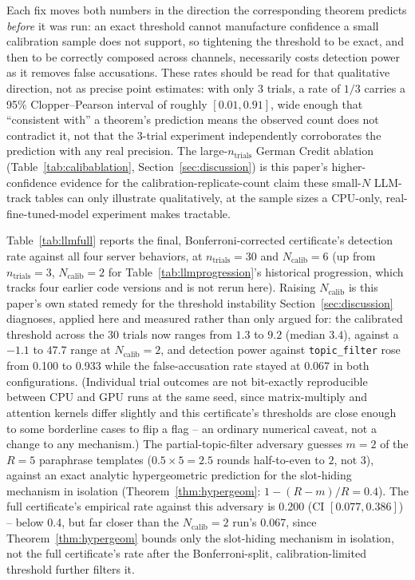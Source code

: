 \documentclass[10pt,journal,compsoc]{IEEEtran}
\begin{document}
Each fix moves both numbers in the direction the corresponding theorem predicts \emph{before} it was run: an exact threshold cannot manufacture confidence a small calibration sample does not support, so tightening the threshold to be exact, and then to be correctly composed across channels, necessarily costs detection power as it removes false accusations. These rates should be read for that qualitative direction, not as precise point estimates: with only 3 trials, a rate of $1/3$ carries a 95\% Clopper--Pearson interval of roughly $[0.01, 0.91]$, wide enough that ``consistent with'' a theorem's prediction means the observed count does not contradict it, not that the 3-trial experiment independently corroborates the prediction with any real precision. The large-$n_{\text{trials}}$ German Credit ablation (Table~\ref{tab:calibablation}, Section~\ref{sec:discussion}) is this paper's higher-confidence evidence for the calibration-replicate-count claim these small-$N$ LLM-track tables can only illustrate qualitatively, at the sample sizes a CPU-only, real-fine-tuned-model experiment makes tractable.

Table~\ref{tab:llmfull} reports the final, Bonferroni-corrected certificate's detection rate against all four server behaviors, at $n_{\text{trials}}=30$ and $N_{\text{calib}}=6$ (up from $n_{\text{trials}}=3$, $N_{\text{calib}}=2$ for Table~\ref{tab:llmprogression}'s historical progression, which tracks four earlier code versions and is not rerun here). Raising $N_{\text{calib}}$ is this paper's own stated remedy for the threshold instability Section~\ref{sec:discussion} diagnoses, applied here and measured rather than only argued for: the calibrated threshold across the 30 trials now ranges from $1.3$ to $9.2$ (median $3.4$), against a $-1.1$ to $47.7$ range at $N_{\text{calib}}=2$, and detection power against \texttt{topic\_filter} rose from 0.100 to 0.933 while the false-accusation rate stayed at 0.067 in both configurations. (Individual trial outcomes are not bit-exactly reproducible between CPU and GPU runs at the same seed, since matrix-multiply and attention kernels differ slightly and this certificate's thresholds are close enough to some borderline cases to flip a flag -- an ordinary numerical caveat, not a change to any mechanism.) The partial-topic-filter adversary guesses $m=2$ of the $R=5$ paraphrase templates ($0.5\times5=2.5$ rounds half-to-even to $2$, not $3$), against an exact analytic hypergeometric prediction for the slot-hiding mechanism in isolation (Theorem~\ref{thm:hypergeom}: $1-(R-m)/R=0.4$). The full certificate's empirical rate against this adversary is 0.200 (CI $[0.077, 0.386]$) -- below 0.4, but far closer than the $N_{\text{calib}}=2$ run's 0.067, since Theorem~\ref{thm:hypergeom} bounds only the slot-hiding mechanism in isolation, not the full certificate's rate after the Bonferroni-split, calibration-limited threshold further filters it.
\end{document}
